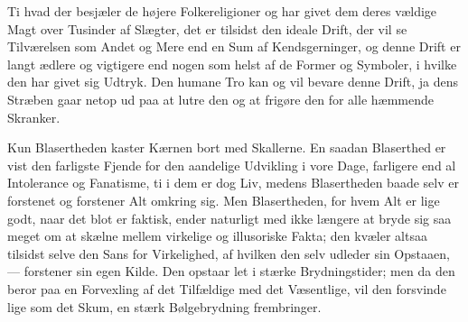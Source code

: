 \documentclass[12pt,a4paper]{article}
\begin{document}
Ti hvad der besjæler de højere Folkereligioner og har givet dem deres
vældige Magt over Tusinder af Slægter, det er tilsidst den ideale Drift,
der vil se Tilværelsen som Andet og Mere end en Sum af Kendsgerninger,
og denne Drift er langt ædlere og vigtigere end nogen som helst af de
Former og Symboler, i hvilke den har givet sig Udtryk. Den humane Tro
kan og vil bevare denne Drift, ja dens Stræben gaar netop ud paa at
lutre den og at frigøre den for alle hæmmende Skranker.

Kun Blasertheden kaster Kærnen bort med Skallerne. En saadan Blaserthed
er vist den farligste Fjende for den aandelige Udvikling i vore Dage,
farligere end al Intolerance og Fanatisme, ti i dem er dog Liv, medens
Blasertheden baade selv er forstenet og forstener Alt omkring sig. Men
Blasertheden, for hvem Alt er lige godt, naar det blot er faktisk,
ender naturligt med ikke længere at bryde sig saa meget om at skælne
mellem virkelige og illusoriske Fakta; den kvæler altsaa tilsidst selve
den Sans for Virkelighed, af hvilken den selv udleder sin Opstaaen, ---
forstener sin egen Kilde. Den opstaar let i stærke Brydningstider; men
da den beror paa en Forvexling af det Tilfældige med det Væsentlige,
vil den forsvinde lige som det Skum, en stærk Bølgebrydning frembringer.
\end{document}
